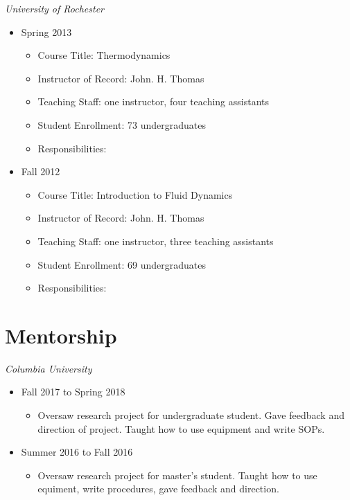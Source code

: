 \textit{University of Rochester} 
\begin{itemize}
\item Spring 2013
	\begin{itemize}
	\item Course Title: Thermodynamics
	\item Instructor of Record: John. H. Thomas
	\item Teaching Staff: one instructor, four teaching assistants
	\item Student Enrollment: 73 undergraduates
	\item {\color{red}Responsibilities:}
	\end{itemize}
\item Fall 2012
	\begin{itemize}
	\item Course Title: Introduction to Fluid Dynamics
	\item Instructor of Record: John. H. Thomas
	\item Teaching Staff: one instructor, three teaching assistants
	\item Student Enrollment: 69 undergraduates
	\item {\color{red}Responsibilities:}
	\end{itemize}
\end{itemize} 


\section{Mentorship}

\textit{Columbia University} 
\begin{itemize}
\item Fall 2017 to Spring 2018
	\begin{itemize}
	\item {\color{red}Oversaw research project for undergraduate student. Gave feedback and direction of project. Taught how to use equipment and write SOPs.}
	\end{itemize}
\item Summer 2016 to Fall 2016
	\begin{itemize}
	\item {\color{red}Oversaw research project for master's student. Taught how to use equiment, write procedures, gave feedback and direction.}
	\end{itemize}
\end{itemize} 
